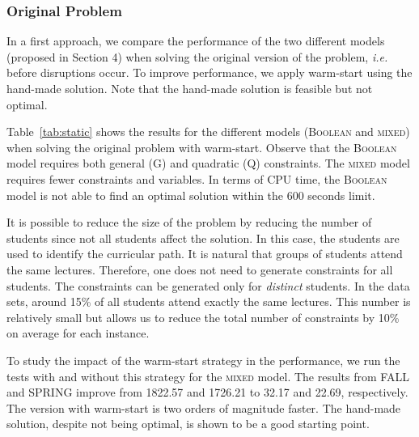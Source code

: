 \documentclass[runningheads]{llncs}
\begin{document}
\subsubsection{Original Problem} In a first approach, we compare the performance of the two different models (proposed in Section 4) when solving the original version of the problem, \emph{i.e.} before disruptions occur. To improve performance, we apply warm-start using the hand-made solution. Note that the hand-made solution is feasible but not optimal. 

Table~\ref{tab:static} shows the results for the different models (\textsc{Boolean} and \textsc{mixed}) when solving the original problem with warm-start. Observe that the \textsc{Boolean} model requires both general (G) and quadratic (Q) constraints. The \textsc{mixed} model requires fewer constraints and variables. In terms of CPU time, the \textsc{Boolean} model is not able to find an optimal solution within the 600 seconds limit. %

It is possible to reduce the size of the problem by reducing the number of students since not all students affect the solution. In this case, the students are used to identify the curricular path. It is natural that groups of students attend the same lectures. Therefore, one does not need to generate constraints for all students. The constraints can be generated only for \textit{distinct} students. In the data sets, around 15\% of all students attend exactly the same lectures. This number is relatively small but allows us to reduce the total number of constraints by 10\% on average for each instance. 

To study the impact of the warm-start strategy in the performance, we run the tests with and without this strategy for the \textsc{mixed} model. The results from \textsc{FALL} and \textsc{SPRING} improve from 1822.57 and 1726.21 to 32.17 and 22.69, respectively.  The version with warm-start is two orders of magnitude faster. The hand-made solution, despite not being optimal, is shown to be a good starting point. 
\end{document}
